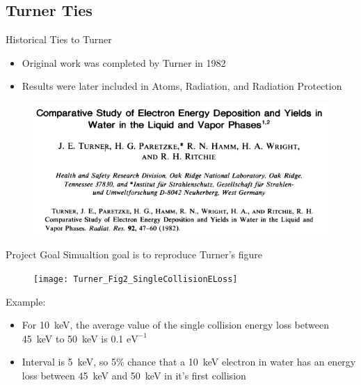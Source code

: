 \documentclass[compress]{beamer}
\begin{document}
\subsection{Turner Ties}
\begin{frame}{Historical Ties to Turner}
  \begin{itemize}
    \item Original work was completed by Turner in 1982
    \item Results were later included in Atoms, Radiation, and Radiation Protection
  \end{itemize}
    \begin{figure}
      \centering
      \includegraphics[width=0.75\textheight]{TurnerArticleHeading}
    \end{figure}
\end{frame}
\begin{frame}{Project Goal}
  \centering
  Simualtion goal is to reproduce Turner's figure
  \begin{figure}
    \texttt{[image: Turner\_Fig2\_SingleCollisionELoss]}
  \end{figure}
  \flushleft
  Example:
  \begin{itemize}
    \small
    \item For \SI{10}{\keV}, the average value of the single collision energy loss between \SI{45}{\keV} to \SI{50}{\keV} is 0.1 $\text{eV}^{-1}$
    \item Interval is \SI{5}{\keV}, so 5\% chance that a \SI{10}{\keV} electron in water has an energy loss between \SI{45}{\keV} and \SI{50}{\keV} in it's first collision
  \end{itemize}
\end{frame}
\end{document}
